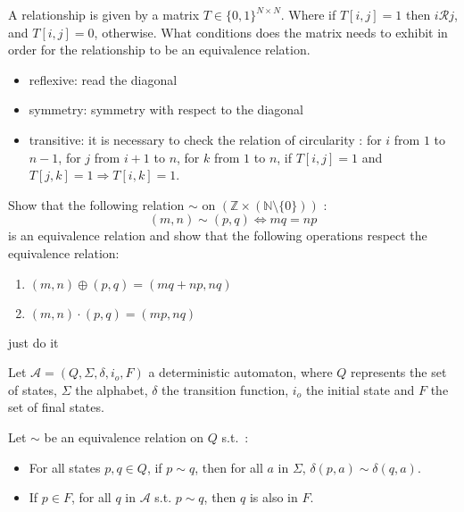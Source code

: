 \documentclass[a4paper,11pt]{exam}
\newcommand{\Z}{\mathbb{Z}}
\newcommand{\N}{\mathbb{N}}
\newcommand{\A}{\mathcal{A}}
\newcommand{\RR}{\mathbin{\mathcal{R}}}
\begin{document}
\begin{questions}
  \question
  A relationship is given by a matrix $ T \in \{0,1\}^{N\times N}$. Where if $T[i,j] =1$ then $i \RR j$, and $T[i,j] = 0$, otherwise.
  What conditions does the matrix needs to exhibit in order for the relationship to be  an equivalence relation.
  
  \begin{solution}
    \begin{itemize}
      \item reflexive: read the diagonal
      \item symmetry: symmetry with respect to the diagonal
      \item transitive: it is necessary to check the relation of circularity : 
        for $ i $ from $ 1 $ to $ n-1 $, for $ j $ from $ i + 1 $ to $ n $, for $ k $ from $ 1 $ to
        $n$, if $T[i,j]=1$ and $T[j,k]=1 \Rightarrow T[i,k]=1$.
    \end{itemize}
  \end{solution}

  \question
  Show that the following relation  $\sim$ on $(\Z \times(\N\setminus\{0\}))$ :
  \[
    (m,n) \sim (p,q) \Leftrightarrow mq = np
  \]
  is an equivalence relation and show that the following operations respect the equivalence relation:
  \begin{enumerate}
  	\item $(m,n) \oplus(p,q) = (mq+np,nq) $
  	\item $(m,n) \cdot(p,q) = (mp,nq) $
  \end{enumerate}

  \begin{solution}
just do it
  \end{solution}
  \bigskip

  Let $\A = (Q, \Sigma,\delta, i_o, F )$ a deterministic automaton, where $ Q $ represents the set of states, $\Sigma$ the alphabet, $\delta$ the transition function, $i_o$ the initial state and $F$ the set of final states.

  Let $\sim$ be an equivalence relation on $ Q $ s.t.~:
  \begin{itemize}
    \item For all states $p,q\in Q$, if $p \sim q$, then for all $a$ in $\Sigma$, $\delta(p,a) \sim \delta(q,a)$.
    \item If $p\in F$, for all $q$ in $\A$ s.t. $p\sim q$, then
      $q$ is also in $F$.
  \end{itemize}


\end{questions}
\end{document}
